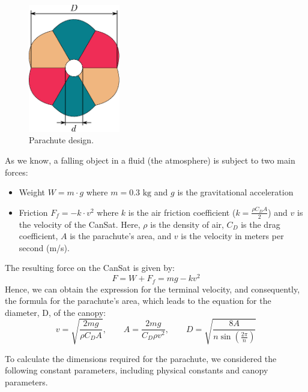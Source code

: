 \documentclass[11pt]{article}
\begin{document}
\begin{figure}
    \centering
    \includegraphics[width=4cm]{images/img_canopy2.eps}
    \caption{\small{Parachute design.}}
    \label{fig:software_fiagram}
\end{figure}

As we know, a falling object in a fluid (the atmosphere) is subject to two main forces:
\begin{itemize}[leftmargin=1cm,itemindent=0.5cm,noitemsep, topsep=4pt, label=$\bullet$]
    \item Weight $W = m \cdot g$ where $m = 0.3\text{ kg}$ and $g$ is the gravitational acceleration
    \item Friction $F_f = -k \cdot v^2$ where $k$ is the air friction coefficient ($\displaystyle k = \frac{\rho C_D A}{2}$) and $v$ is the velocity of the CanSat. Here, $\rho$ is the density of air, $C_D$ is the drag coefficient, $A$ is the parachute's area, and $v$ is the velocity in meters per second (m/s).
\end{itemize}

The resulting force on the CanSat is given by:
\begin{equation*}
F = W + F_f = mg - kv^2
\end{equation*}
Hence, we can obtain the expression for the terminal velocity, and consequently, the formula for the parachute's area, which leads to the equation for the diameter, D, of the canopy:
\begin{equation*}
v = \sqrt{\frac{2mg}{\rho C_D A}},\quad\quad A=\frac{2mg}{C_D \rho v^2}, \quad\quad D = \sqrt{\frac{8A}{n \sin\left(\frac{2\pi}{n}\right)}}
\end{equation*}


To calculate the dimensions required for the parachute, we considered the following constant parameters, including physical constants and canopy parameters.
\end{document}
